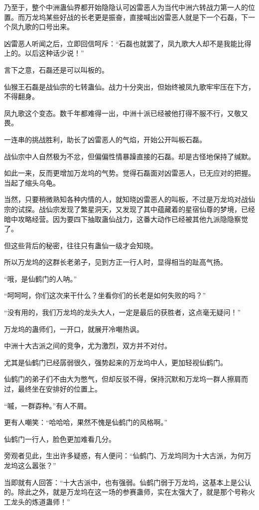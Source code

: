\begin{this_body}
乃至于，整个中洲蛊仙界都开始隐隐认可凶雷恶人为当代中洲六转战力第一人的位置。而万龙坞某些好战的长老更是振奋，直接喊出凶雷恶人就是下一个石磊，下一个凤九歌的口号出来。

凶雷恶人听闻之后，立即回信呵斥：“石磊也就罢了，凤九歌大人却不是我能比得上的。以后这种话少说！”

言下之意，石磊还是可以叫板的。

仙猴王石磊是战仙宗的七转蛊仙。战力十分突出，但始终被凤九歌牢牢压在下方，不得翻身。

凤九歌这个变态。数千年都难得一出，中洲十派已经被他打得不服不行，又敬又畏。

一连串的挑战胜利，助长了凶雷恶人的气焰，开始公开叫板石磊。

战仙宗中人自然极为不忿，但偏偏性情暴躁直接的石磊。却是古怪地保持了缄默。

如此一来，反而更增加万龙坞的气势。觉得石磊面对凶雷恶人，已无应对的把握。当起了缩头乌龟。

当然，只要稍微熟知各种内情的人，就知晓凶雷恶人的叫板，不过是万龙坞对战仙宗的试探。战仙宗发现了繁星洞天，又发现了其中蕴藏着的星宿仙尊的梦境，已经暗中攻略经营。因为要四下抽取蛊仙战力，这番大动作已经被其他九派隐隐察觉了。

但这些背后的秘密，往往只有蛊仙一级才会知晓。

所以万龙坞的这群长老弟子，见到方正一行人时，显得相当的趾高气扬。

“哦，是仙鹤门的人呐。”

“呵呵呵，你们这次来干什么？坐看你们的长老是如何失败的吗？”

“没有用的，我们万龙坞的龙头大人，一定是最后的获胜者，这点毫无疑问！”

万龙坞的蛊师们，一开口，就展开冷嘲热讽。

中洲十大古派之间的竞争，尤为激烈，双方并不对付。

尤其是仙鹤门已经孱弱很久，强势起来的万龙坞中人，更加轻视仙鹤门。

仙鹤门的弟子们不由大为憋气，但却反驳不得，保持沉默和万龙坞一群人擦肩而过，最终坐在安排好的位置上。

“嘁，一群孬种。”有人不屑。

更有人嘲笑：“哈哈哈，果然不愧是仙鹤门的风格啊。”

仙鹤门一行人，脸色更加难看几分。

旁观者见此，生出许多疑惑，有人便问：“仙鹤门、万龙坞同为十大古派，为何万龙坞这么嚣张？”

当即就有人回答：“十大古派中，也有强弱。仙鹤门弱于万龙坞，这基本上是公认的。除此之外，就是万龙坞在这一场的参赛蛊师，实在太强大了，就是那个号称火工龙头的炼道蛊师！”


\end{this_body}
